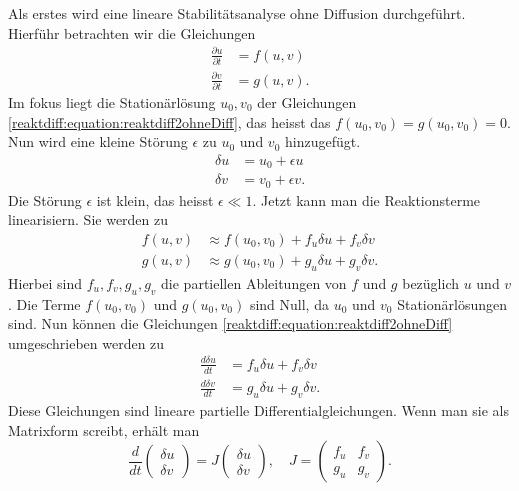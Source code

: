 Als erstes wird eine lineare Stabilitätsanalyse ohne Diffusion durchgeführt.
Hierführ betrachten wir die Gleichungen
\begin{align}
    \label{reaktdiff:equation:reaktdiff2ohneDiff}
    \frac{\partial u}{\partial t} &= f(u,v)\\
    \frac{\partial v}{\partial t} &= g(u,v).
\end{align}
Im fokus liegt die Stationärlösung \(u_0, v_0\) der Gleichungen \ref{reaktdiff:equation:reaktdiff2ohneDiff}, das heisst das \(f(u_0,v_0) = g(u_0,v_0) = 0\).
Nun wird eine kleine Störung \(\epsilon\) zu \(u_0\) und \(v_0\) hinzugefügt.
\begin{align}
    \delta u &= u_0 + \epsilon u\\
    \delta v &= v_0 + \epsilon v.
\end{align}
Die Störung \(\epsilon\) ist klein, das heisst \(\epsilon \ll 1\).
Jetzt kann man die Reaktionsterme linearisiern.
Sie werden zu
\begin{align}
    f(u,v) &\approx f(u_0,v_0) + f_u \delta u + f_v\delta v\\
    g(u,v) &\approx g(u_0,v_0) + g_u \delta u + g_v\delta v.
\end{align}
Hierbei sind \(f_u, f_v, g_u, g_v\) die partiellen Ableitungen von \(f\) und \(g\) bezüglich \(u\) und \(v\).
Die Terme \(f(u_0,v_0)\) und \(g(u_0,v_0)\) sind Null, da \(u_0\) und \(v_0\) Stationärlösungen sind.
Nun können die Gleichungen \ref{reaktdiff:equation:reaktdiff2ohneDiff} umgeschrieben werden zu
\begin{align}
    \label{reaktdiff:equation:reaktdiff2ohneDifflinearisiert1}
    \frac{d \delta u}{dt} &= f_u \delta u + f_v \delta v\\
    \label{reaktdiff:equation:reaktdiff2ohneDifflinearisiert2}
    \frac{d \delta v}{dt} &= g_u \delta u + g_v \delta v.
\end{align}
Diese Gleichungen sind lineare partielle Differentialgleichungen.
Wenn man sie als Matrixform screibt, erhält man
\begin{equation}
    \label{reaktdiff:equation:reaktdiff2ohneDiffmatrix}
    \frac{d}{dt} \begin{pmatrix}
        \delta u\\
        \delta v
    \end{pmatrix} = 
    J 
    \begin{pmatrix}
        \delta u\\
        \delta v
    \end{pmatrix}
    , \quad
    J =
    \begin{pmatrix}
        f_u & f_v\\
        g_u & g_v
    \end{pmatrix}.
\end{equation}

